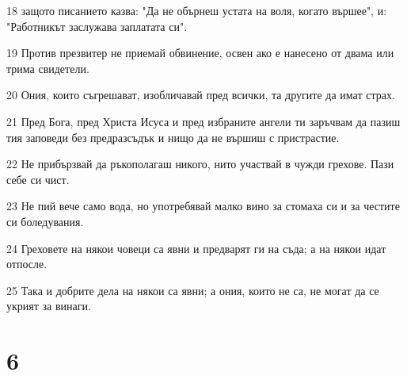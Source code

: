 \par 18 защото писанието казва: "Да не обърнеш устата на воля, когато вършее", и: "Работникът заслужава заплатата си".
\par 19 Против презвитер не приемай обвинение, освен ако е нанесено от двама или трима свидетели.
\par 20 Ония, които съгрешават, изобличавай пред всички, та другите да имат страх.
\par 21 Пред Бога, пред Христа Исуса и пред избраните ангели ти заръчвам да пазиш тия заповеди без предразсъдък и нищо да не вършиш с пристрастие.
\par 22 Не прибързвай да ръкополагаш никого, нито участвай в чужди грехове. Пази себе си чист.
\par 23 Не пий вече само вода, но употребявай малко вино за стомаха си и за честите си боледувания.
\par 24 Греховете на някои човеци са явни и предварят ги на съда; а на някои идат отпосле.
\par 25 Така и добрите дела на някои са явни; а ония, които не са, не могат да се укрият за винаги.

\chapter{6}

